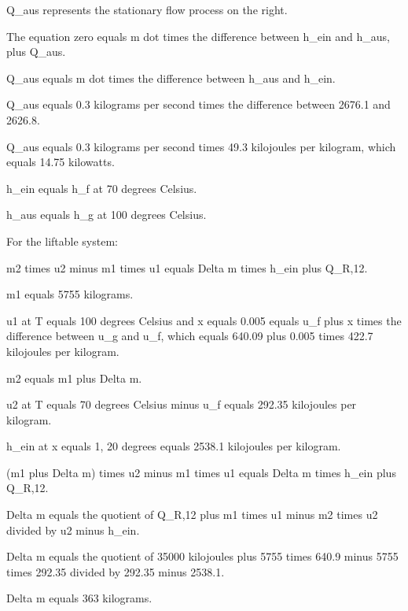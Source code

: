 Q_aus represents the stationary flow process on the right.

The equation zero equals m dot times the difference between h_ein and h_aus, plus Q_aus.

Q_aus equals m dot times the difference between h_aus and h_ein.

Q_aus equals 0.3 kilograms per second times the difference between 2676.1 and 2626.8.

Q_aus equals 0.3 kilograms per second times 49.3 kilojoules per kilogram, which equals 14.75 kilowatts.

h_ein equals h_f at 70 degrees Celsius.

h_aus equals h_g at 100 degrees Celsius.

For the liftable system:

m2 times u2 minus m1 times u1 equals Delta m times h_ein plus Q_R,12.

m1 equals 5755 kilograms.

u1 at T equals 100 degrees Celsius and x equals 0.005 equals u_f plus x times the difference between u_g and u_f, which equals 640.09 plus 0.005 times 422.7 kilojoules per kilogram.

m2 equals m1 plus Delta m.

u2 at T equals 70 degrees Celsius minus u_f equals 292.35 kilojoules per kilogram.

h_ein at x equals 1, 20 degrees equals 2538.1 kilojoules per kilogram.

(m1 plus Delta m) times u2 minus m1 times u1 equals Delta m times h_ein plus Q_R,12.

Delta m equals the quotient of Q_R,12 plus m1 times u1 minus m2 times u2 divided by u2 minus h_ein.

Delta m equals the quotient of 35000 kilojoules plus 5755 times 640.9 minus 5755 times 292.35 divided by 292.35 minus 2538.1.

Delta m equals 363 kilograms.